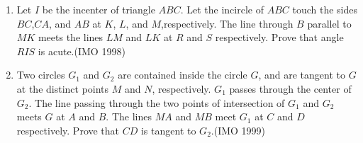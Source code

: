 \begin{enumerate}[label=\thesubsection.\arabic*,ref=\thesubsection.\theenumi]
\item Let $I$ be the incenter of triangle $ABC$. Let the incircle of $ABC$ touch the sides $BC$,$CA$, and $AB$ at $K$, $L$, and $M$,respectively. The line through $B$ parallel to $MK$ meets the lines $LM$ and $LK$ at $R$ and $S$ respectively. Prove that angle $RIS$ is acute.\hfill(IMO  1998)
%
\item Two circles ${G_{1}}$ and ${G_{2}}$ are contained inside the circle $G$, and are tangent to $G$ at the distinct points $M$ and $N$, respectively. ${G_{1}}$ passes through the center of ${G_{2}}$. The line passing through the two points of intersection of ${G_{1}}$ and ${G_{2}}$ meets $G$ at $A$ and $B$. The lines $MA$ and $MB$ meet ${G_{1}}$ at $C$ and $D$ respectively. Prove that $CD$ is tangent to ${G_{2}}$.\hfill(IMO  1999)
                      	

\end{enumerate}
